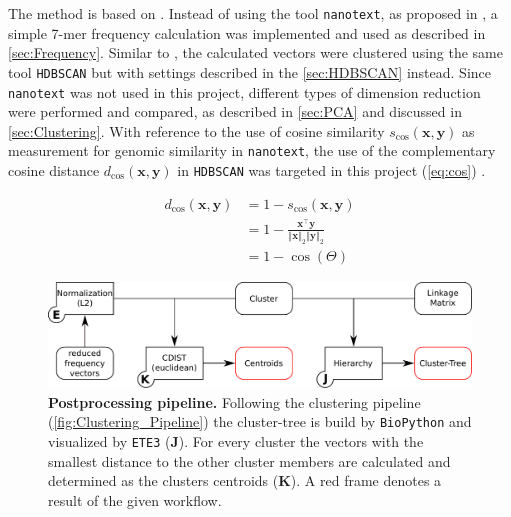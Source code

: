 \vspace{1em}

The method is based on \textcite{viehweger_addressing_2019}. Instead of using the tool \texttt{nanotext}, as proposed in \textcite{viehweger_encoding_2019}, a simple 7-mer frequency calculation was implemented and used as described in \autoref{sec:Frequency}. Similar to \textcite{viehweger_addressing_2019}, the calculated vectors were clustered using the same tool \texttt{HDBSCAN} but with settings described in the \autoref{sec:HDBSCAN} instead. Since \texttt{nanotext} was not used in this project, different types of dimension reduction were performed and compared, as described in \autoref{sec:PCA} and discussed in \autoref{sec:Clustering}. With reference to the use of cosine similarity $s_{\text{cos}}(\mathbf{x}, \mathbf{y})$ as measurement for genomic similarity in \texttt{nanotext}, the use of the complementary cosine distance $d_{\text{cos}}(\mathbf{x}, \mathbf{y})$ in \texttt{HDBSCAN} was targeted in this project (\autoref{eq:cos}) \autocite{viehweger_encoding_2019}. %

\begin{equation}\label{eq:cos}
    \begin{aligned}
        d_{\text{cos}}(\mathbf{x}, \mathbf{y}) &= 1 - s_{\text{cos}}(\mathbf{x}, \mathbf{y})\\
        &= 1 - \frac{\mathbf{x}^\top\mathbf{y}}{\Vert\mathbf{x}\Vert_2 \Vert\mathbf{y}\Vert_2}\\
        &= 1 - \cos (\Theta)
    \end{aligned}
\end{equation}

\begin{figure}[!hbt]
    \centering
    \includegraphics[width=\textwidth]{Graphics/Tree.pdf}
    \caption[Postprocessing pipeline]{\textbf{Postprocessing pipeline.} Following the clustering pipeline (\autoref{fig:Clustering_Pipeline}) the cluster-tree is build by \texttt{BioPython} and visualized by \texttt{ETE3} (\textsf{\textbf{J}}). For every cluster the vectors with the smallest distance to the other cluster members are calculated and determined as the clusters centroids (\textsf{\textbf{K}}). A red frame denotes a result of the given workflow.}
    \label{fig:Tree_Pipeline}
\end{figure}

